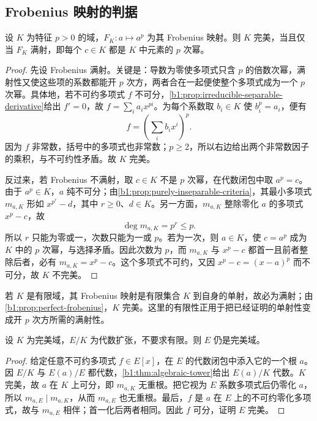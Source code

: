 \subsection{Frobenius 映射的判据}
\label{b1:subsec:1603:02}

\begin{proposition}\label{b1:prop:perfect-frobenius}
	设 \(K\) 为特征 \(p>0\) 的域，\(F_K:a\mapsto a^p\) 为其 Frobenius 映射。则 \(K\) 完美，当且仅当 \(F_K\) 满射，即每个 \(c\in K\) 都是 \(K\) 中元素的 \(p\) 次幂。
\end{proposition}
\begin{proof}
	先设 Frobenius 满射。关键是：导数为零使多项式只含 \(p\) 的倍数次幂，满射性又使这些项的系数都能开 \(p\) 次方，两者合在一起便使整个多项式成为一个 \(p\) 次幂。具体地，若不可约多项式 \(f\) 不可分，\cref{b1:prop:irreducible-separable-derivative}给出 \(f'=0\)，故 \(f=\sum_i a_ix^{pi}\)。为每个系数取 \(b_i\in K\) 使 \(b_i^p=a_i\)，便有
	\[
		f=\left(\sum_i b_ix^i\right)^p.
	\]
	因为 \(f\) 非常数，括号中的多项式也非常数；\(p\ge2\)，所以右边给出两个非常数因子的乘积，与不可约性矛盾。故 \(K\) 完美。

	反过来，若 Frobenius 不满射，取 \(c\in K\) 不是 \(p\) 次幂，在代数闭包中取 \(a^p=c\)。由于 \(a^p\in K\)，\(a\) 纯不可分；由\cref{b1:prop:purely-inseparable-criteria}，其最小多项式 \(m_{a,K}\) 形如 \(x^{p^r}-d\)，其中 \(r\ge0\)、\(d\in K\)。另一方面，\(m_{a,K}\) 整除零化 \(a\) 的多项式 \(x^p-c\)，故
	\[
		\deg m_{a,K}=p^r\le p.
	\]
	所以 \(r\) 只能为零或一，次数只能为一或 \(p\)。若为一次，则 \(a\in K\)，使 \(c=a^p\) 成为 \(K\) 中的 \(p\) 次幂，与选择矛盾。因此次数为 \(p\)，而 \(m_{a,K}\) 与 \(x^p-c\) 都首一且前者整除后者，必有 \(m_{a,K}=x^p-c\)。这个多项式不可约，又因 \(x^p-c=(x-a)^p\) 而不可分，故 \(K\) 不完美。
\end{proof}
若 \(K\) 是有限域，其 Frobenius 映射是有限集合 \(K\) 到自身的单射，故必为满射；由\cref{b1:prop:perfect-frobenius}，\(K\) 完美。这里的有限性正用于把已经证明的单射性变成开 \(p\) 次方所需的满射性。

\begin{corollary}\label{b1:cor:algebraic-perfect-extension}
	设 \(K\) 为完美域，\(E/K\) 为代数扩张，不要求有限。则 \(E\) 仍是完美域。
\end{corollary}
\begin{proof}
	给定任意不可约多项式 \(f\in E[x]\)，在 \(E\) 的代数闭包中添入它的一个根 \(a\)。因 \(E/K\) 与 \(E(a)/E\) 都代数，\cref{b1:thm:algebraic-tower}给出 \(E(a)/K\) 代数。\(K\) 完美，故 \(a\) 在 \(K\) 上可分，即 \(m_{a,K}\) 无重根。把它视为 \(E\) 系数多项式后仍零化 \(a\)，所以 \(m_{a,E}\mid m_{a,K}\)，从而 \(m_{a,E}\) 也无重根。最后，\(f\) 是 \(a\) 在 \(E\) 上的不可约零化多项式，故与 \(m_{a,E}\) 相伴；首一化后两者相同。因此 \(f\) 可分，证明 \(E\) 完美。
\end{proof}

